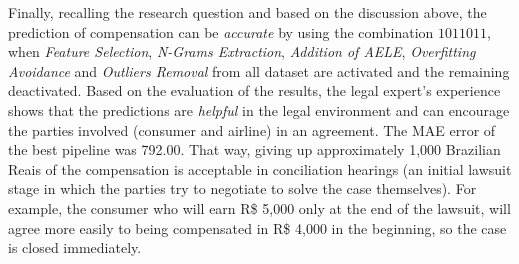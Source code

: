 Finally, recalling the research question and based on the discussion above, the prediction of compensation can be \textit{accurate} by using the combination $1011011$, when \textit{Feature Selection}, \textit{N-Grams Extraction}, \textit{Addition of \gls{AELE}}, \textit{Overfitting Avoidance} and \textit{Outliers Removal} from all dataset are activated and the remaining deactivated. 
Based on the evaluation of the results, the legal expert's experience shows that the predictions are \textit{helpful} in the legal environment and can encourage the parties involved (consumer and airline) in an agreement. The \gls{MAE} error of the best pipeline was 792.00. That way, giving up approximately 1,000 Brazilian Reais of the compensation is acceptable in conciliation hearings (an initial lawsuit stage in which the parties try to negotiate to solve the case themselves). For example, the consumer who will earn R\$ 5,000 only at the end of the lawsuit, will agree more easily to being compensated in R\$ 4,000 in the beginning, so the case is closed immediately.



